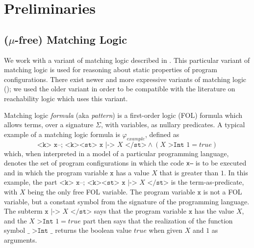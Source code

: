 \section{Preliminaries}

\subsection{($\mu$-free) Matching Logic}

We work with a variant of matching logic described in
\cite{StefanescuCMMSR19,RosuSCM13lics}.
This particular variant of matching logic is used for reasoning about static properties of program configurations.
There exist newer and more expressive variants of matching logic (\cite{MmL, MLexplained});
we used the older variant in order to be compatible with the literature on reachability logic which uses this variant.

Matching logic \emph{formula} (aka \emph{pattern}) is a first-order logic (FOL) formula which allows terms,
over a signature $\Sigma$, with variables, as nullary predicates.
A typical example of a matching logic formula is $\varphi_{\mathit{example}}$, defined as
\begin{equation}\label{eqn:exampleMLPattern}
\texttt{<k> x--; <k><st> x} \texttt{ |-> } X\texttt{ </st>} \land (X \texttt{ >Int } 1 = \mathit{true})
\end{equation}
which, when interpreted in a model of a particular programming language,
denotes the set of program configurations in which the code \texttt{x--} is to be executed
and in which the program variable $\texttt{x}$ has a value $X$ that is greater than $1$.
In this example, the part $\texttt{<k> x--; <k><st> x} \texttt{ |-> } X\texttt{ </st>}$
is the term-as-predicate, with $X$ being the only free FOL variable.
The program variable $\texttt{x}$ is not a FOL variable, but a constant symbol from the signature of the programming language.
The subterm $\texttt{x} \texttt{ |-> } X\texttt{ </st>}$ says that the program variable $\texttt{x}$
has the value $X$, and the $X \texttt{ >Int } 1 = \mathit{true}$ part then says that the realization
of the function symbol $\_ \texttt{ >Int } \_$ returns the boolean value $\mathit{true}$ when given $X$ and $1$
as arguments.

